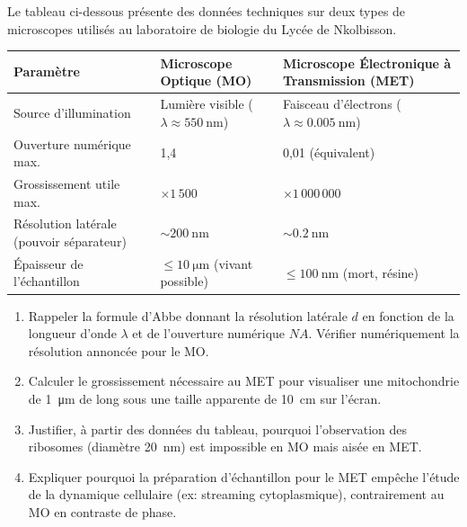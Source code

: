 \documentclass[11pt]{article}
\begin{document}
\begin{exercice}
Le tableau ci-dessous présente des données techniques sur deux types de microscopes utilisés au laboratoire de biologie du Lycée de Nkolbisson.

\begin{tabularx}{\linewidth}{@{}lXX@{}}
\toprule
\textbf{Paramètre} & \textbf{Microscope Optique (MO)} & \textbf{Microscope Électronique à Transmission (MET)} \\
\midrule
Source d'illumination & Lumière visible ($\lambda \approx \SI{550}{\nano\meter}$) & Faisceau d'électrons ($\lambda \approx \SI{0,005}{\nano\meter}$) \\
Ouverture numérique max. & 1,4 & 0,01 (équivalent) \\
Grossissement utile max. & $\times 1\,500$ & $\times 1\,000\,000$ \\
Résolution latérale (pouvoir séparateur) & $\sim \SI{200}{\nano\meter}$ & $\sim \SI{0,2}{\nano\meter}$ \\
Épaisseur de l'échantillon & $\le \SI{10}{\micro\meter}$ (vivant possible) & $\le \SI{100}{\nano\meter}$ (mort, résine) \\
\bottomrule
\end{tabularx}

\begin{enumerate}
\item Rappeler la formule d'Abbe donnant la résolution latérale $d$ en fonction de la longueur d'onde $\lambda$ et de l'ouverture numérique $NA$. Vérifier numériquement la résolution annoncée pour le MO.
\item Calculer le grossissement nécessaire au MET pour visualiser une mitochondrie de \SI{1}{\micro\meter} de long sous une taille apparente de \SI{10}{\centi\meter} sur l'écran.
\item Justifier, à partir des données du tableau, pourquoi l'observation des ribosomes (diamètre \SI{20}{\nano\meter}) est impossible en MO mais aisée en MET.
\item Expliquer pourquoi la préparation d'échantillon pour le MET empêche l'étude de la dynamique cellulaire (ex: streaming cytoplasmique), contrairement au MO en contraste de phase.
\end{enumerate}
\end{exercice}
\end{document}
